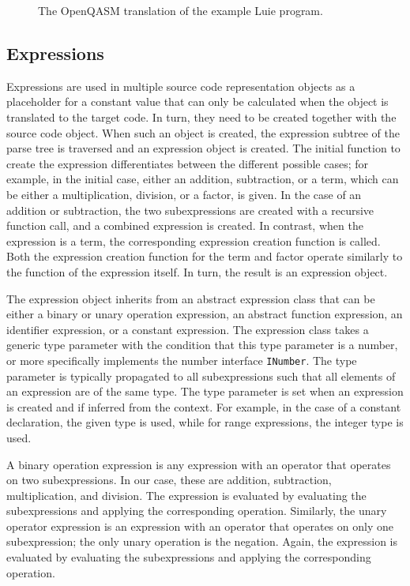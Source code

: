 \begin{figure}
    \centering
    
    \caption{The OpenQASM translation of the example Luie program.}
    \label{fig:codeGen_target_example}
\end{figure}


\subsection{Expressions}
\label{sec:implementation_expression}
Expressions are used in multiple source code representation objects as a placeholder for a constant value that can only be calculated when the object is translated to the target code. In turn, they need to be created together with the source code object. When such an object is created, the expression subtree of the parse tree is traversed and an expression object is created. The initial function to create the expression differentiates between the different possible cases; for example, in the initial case, either an addition, subtraction, or a term, which can be either a multiplication, division, or a factor, is given. In the case of an addition or subtraction, the two subexpressions are created with a recursive function call, and a combined expression is created. In contrast, when the expression is a term, the corresponding expression creation function is called. Both the expression creation function for the term and factor operate similarly to the function of the expression itself. In turn, the result is an expression object. 

The expression object inherits from an abstract expression class that can be either a binary or unary operation expression, an abstract function expression, an identifier expression, or a constant expression. The expression class takes a generic type parameter with the condition that this type parameter is a number, or more specifically implements the number interface \texttt{INumber}. The type parameter is typically propagated to all subexpressions such that all elements of an expression are of the same type. The type parameter is set when an expression is created and if inferred from the context. For example, in the case of a constant declaration, the given type is used, while for range expressions, the integer type is used.

A binary operation expression is any expression with an operator that operates on two subexpressions. In our case, these are addition, subtraction, multiplication, and division. The expression is evaluated by evaluating the subexpressions and applying the corresponding operation. Similarly, the unary operator expression is an expression with an operator that operates on only one subexpression; the only unary operation is the negation. Again, the expression is evaluated by evaluating the subexpressions and applying the corresponding operation. 

